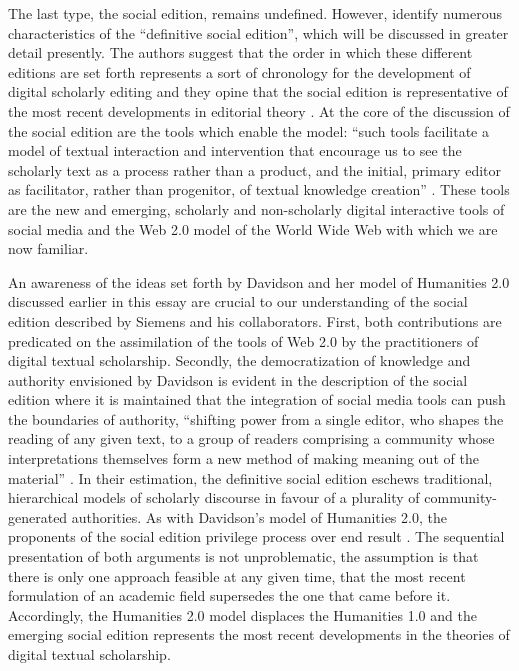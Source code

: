 \begin{paper}
The last type, the social edition, remains undefined. However, \citeauthor{siemens_modeling_2012} identify numerous characteristics of the ``definitive social edition'', which will be discussed in greater detail presently. The authors suggest that the order in which these different editions are set forth represents a sort of chronology for the development of digital scholarly editing and they opine that the social edition is representative of the most recent developments in editorial theory \citep[446--48]{siemens_modeling_2012}. At the core of the discussion of the social edition are the tools which enable the model: ``such tools facilitate a model of textual interaction and intervention that encourage us to see the scholarly text as a process rather than a product, and the initial, primary editor as facilitator, rather than progenitor, of textual knowledge creation'' \citep[ibid]{siemens_modeling_2012}. These tools are the new and emerging, scholarly and non-scholarly digital interactive tools of social media and the Web 2.0 model of the World Wide Web with which we are now familiar.

An awareness of the ideas set forth by Davidson and her model of Humanities 2.0 discussed earlier in this essay are crucial to our understanding of the social edition described by Siemens and his collaborators. First, both contributions are predicated on the assimilation of the tools of Web 2.0 by the practitioners of digital textual scholarship. Secondly, the democratization of knowledge and authority envisioned by Davidson is evident in the description of the social edition where it is maintained that the integration of social media tools can push the boundaries of authority, ``shifting power from a single editor, who shapes the reading of any given text, to a group of readers comprising a community whose interpretations themselves form a new method of making meaning out of the material'' \citep[453]{siemens_modeling_2012}. In their estimation, the definitive social edition eschews traditional, hierarchical models of scholarly discourse in favour of a plurality of community-generated authorities. As with Davidson’s model of Humanities 2.0, the proponents of the social edition privilege process over end result \cite[ibid]{siemens_modeling_2012}. The sequential presentation of both arguments is not unproblematic, the assumption is that there is only one approach feasible at any given time, that the most recent formulation of an academic field supersedes the one that came before it. Accordingly, the Humanities 2.0 model displaces the Humanities 1.0 and the emerging social edition represents the most recent developments in the theories of digital textual scholarship.


\end{paper}
